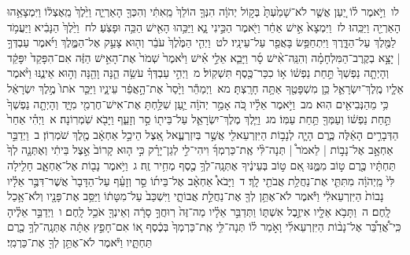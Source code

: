\documentclass[18pt]{article}
\newcommand{\kri}[1]{\Afootnote{#1}}	%
\begin{document}
 {\loc לו~}וַיֹּ֣אמֶר ל֗וֹ יַ֚עַן אֲשֶׁ֤ר לֹא־שָׁמַ֙עְתָּ֙ בְּק֣וֹל יְהֹוָ֔ה הִנְּךָ֤ הוֹלֵךְ֙ מֵֽאִתִּ֔י וְהִכְּךָ֖ הָאַרְיֵ֑ה וַיֵּ֙לֶךְ֙ מֵֽאֶצְל֔וֹ וַיִּמְצָאֵ֥הוּ הָאַרְיֵ֖ה וַיַּכֵּֽהוּ׃ \startlock
 {\loc לז~}וַיִּמְצָא֙ אִ֣ישׁ אַחֵ֔ר וַיֹּ֖אמֶר הַכֵּ֣ינִי נָ֑א וַיַּכֵּ֥הוּ הָאִ֖ישׁ הַכֵּ֥ה וּפָצֹֽעַ׃ \startlock
 {\loc לח~}וַיֵּ֙לֶךְ֙ הַנָּבִ֔יא וַיַּעֲמֹ֥ד לַמֶּ֖לֶךְ עַל־הַדָּ֑רֶךְ וַיִּתְחַפֵּ֥שׂ בָּאֲפֵ֖ר עַל־עֵינָֽיו׃ \startlock
 {\loc לט~}וַיְהִ֤י הַמֶּ֙לֶךְ֙ עֹבֵ֔ר וְה֖וּא צָעַ֣ק אֶל־הַמֶּ֑לֶךְ וַיֹּ֜אמֶר עַבְדְּךָ֣  |  יָצָ֣א בְקֶרֶב־הַמִּלְחָמָ֗ה וְהִנֵּֽה־אִ֨ישׁ סָ֜ר וַיָּבֵ֧א אֵלַ֣י אִ֗ישׁ וַיֹּ֙אמֶר֙ שְׁמֹר֙ אֶת־הָאִ֣ישׁ הַזֶּ֔ה אִם־הִפָּקֵד֙ יִפָּקֵ֔ד וְהָיְתָ֤ה נַפְשְׁךָ֙ תַּ֣חַת נַפְשׁ֔וֹ א֥וֹ כִכַּר־כֶּ֖סֶף תִּשְׁקֽוֹל׃ \startlock
 {\loc מ~}וַיְהִ֣י עַבְדְּךָ֗ עֹשֵׂ֥ה הֵ֛נָּה וָהֵ֖נָּה וְה֣וּא אֵינֶ֑נּוּ וַיֹּ֨אמֶר אֵלָ֧יו מֶֽלֶךְ־יִשְׂרָאֵ֛ל כֵּ֥ן מִשְׁפָּטֶ֖ךָ אַתָּ֥ה חָרָֽצְתָּ׃ \startlock
 {\loc מא~}וַיְמַהֵ֕ר וַיָּ֙סַר֙ אֶת־הָ֣אֲפֵ֔ר  \edtext{(מעל)}{\kri{קרי: מֵעֲלֵ֖י}}  עֵינָ֑יו וַיַּכֵּ֤ר אֹתוֹ֙ מֶ֣לֶךְ יִשְׂרָאֵ֔ל כִּ֥י מֵהַנְּבִיאִ֖ים הֽוּא׃ \startlock
 {\loc מב~}וַיֹּ֣אמֶר אֵלָ֗יו כֹּ֚ה אָמַ֣ר יְהֹוָ֔ה יַ֛עַן שִׁלַּ֥חְתָּ אֶת־אִישׁ־חֶרְמִ֖י מִיָּ֑ד וְהָיְתָ֤ה נַפְשְׁךָ֙ תַּ֣חַת נַפְשׁ֔וֹ וְעַמְּךָ֖ תַּ֥חַת עַמּֽוֹ׃ \startlock
 {\loc מג~}וַיֵּ֧לֶךְ מֶלֶךְ־יִשְׂרָאֵ֛ל עַל־בֵּית֖וֹ סַ֣ר וְזָעֵ֑ף וַיָּבֹ֖א שֹֽׁמְרֽוֹנָה׃ 
\startlock
 {\loc א~}וַיְהִ֗י אַחַר֙ הַדְּבָרִ֣ים הָאֵ֔לֶּה כֶּ֧רֶם הָיָ֛ה לְנָב֥וֹת הַיִּזְרְעֵאלִ֖י אֲשֶׁ֣ר בְּיִזְרְעֶ֑אל אֵ֚צֶל הֵיכַ֣ל אַחְאָ֔ב מֶ֖לֶךְ שֹׁמְרֽוֹן׃ \startlock
 {\loc ב~}וַיְדַבֵּ֣ר אַחְאָ֣ב אֶל־נָב֣וֹת  |  לֵאמֹר֩  |  תְּנָה־לִּ֨י אֶֽת־כַּרְמְךָ֜ וִיהִי־לִ֣י לְגַן־יָרָ֗ק כִּ֣י ה֤וּא קָרוֹב֙ אֵ֣צֶל בֵּיתִ֔י וְאֶתְּנָ֤ה לְךָ֙ תַּחְתָּ֔יו כֶּ֖רֶם ט֣וֹב מִמֶּ֑נּוּ אִ֚ם ט֣וֹב בְּעֵינֶ֔יךָ אֶתְּנָֽה־לְךָ֥ כֶ֖סֶף מְחִ֥יר זֶֽה׃ \startlock
 {\loc ג~}וַיֹּ֥אמֶר נָב֖וֹת אֶל־אַחְאָ֑ב חָלִ֤ילָה לִּי֙ מֵֽיְהֹוָ֔ה מִתִּתִּ֛י אֶת־נַחֲלַ֥ת אֲבֹתַ֖י לָֽךְ׃ \startlock
 {\loc ד~}וַיָּבֹא֩ אַחְאָ֨ב אֶל־בֵּית֜וֹ סַ֣ר וְזָעֵ֗ף עַל־הַדָּבָר֙ אֲשֶׁר־דִּבֶּ֣ר אֵלָ֗יו נָבוֹת֙ הַיִּזְרְעֵאלִ֔י וַיֹּ֕אמֶר לֹא־אֶתֵּ֥ן לְךָ֖ אֶת־נַחֲלַ֣ת אֲבוֹתָ֑י וַיִּשְׁכַּב֙ עַל־מִטָּת֔וֹ וַיַּסֵּ֥ב אֶת־פָּנָ֖יו וְלֹא־אָ֥כַל לָֽחֶם׃ \startlock
 {\loc ה~}וַתָּבֹ֥א אֵלָ֖יו אִיזֶ֣בֶל אִשְׁתּ֑וֹ וַתְּדַבֵּ֣ר אֵלָ֗יו מַה־זֶּה֙ רֽוּחֲךָ֣ סָרָ֔ה וְאֵינְךָ֖ אֹכֵ֥ל לָֽחֶם׃ \startlock
 {\loc ו~}וַיְדַבֵּ֣ר אֵלֶ֗יהָ כִּֽי־אֲ֠דַבֵּ֠ר אֶל־נָב֨וֹת הַיִּזְרְעֵאלִ֜י וָאֹ֣מַר ל֗וֹ תְּנָה־לִּ֤י אֶֽת־כַּרְמְךָ֙ בְּכֶ֔סֶף א֚וֹ אִם־חָפֵ֣ץ אַתָּ֔ה אֶתְּנָֽה־לְךָ֥ כֶ֖רֶם תַּחְתָּ֑יו וַיֹּ֕אמֶר לֹא־אֶתֵּ֥ן לְךָ֖ אֶת־כַּרְמִֽי׃ \startlock
\end{document}
